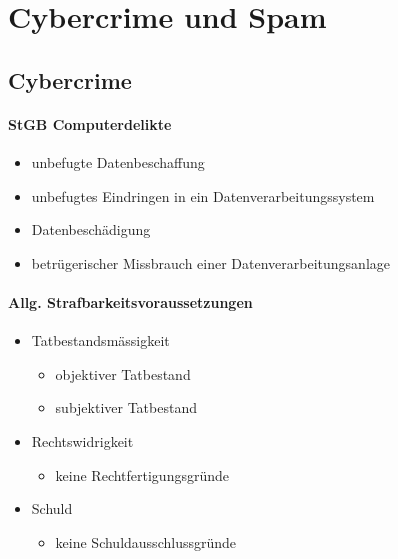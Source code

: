 \section{Cybercrime und Spam}
\subsection{Cybercrime}

\begin{minipage}{0.5\linewidth}
    \paragraph{StGB Computerdelikte}
    \begin{itemize}
        \item unbefugte Datenbeschaffung
        \item unbefugtes Eindringen in ein Datenverarbeitungssystem
        \item Datenbeschädigung
        \item betrügerischer Missbrauch einer Datenverarbeitungsanlage
    \end{itemize}
\end{minipage}
\begin{minipage}{0.5\linewidth}
    \paragraph{Allg. Strafbarkeitsvoraussetzungen}
    \begin{itemize}
        \item Tatbestandsmässigkeit
        \begin{itemize}
            \item objektiver Tatbestand
            \item subjektiver Tatbestand
        \end{itemize}
        \item Rechtswidrigkeit
        \begin{itemize}
            \item keine Rechtfertigungsgründe
        \end{itemize}
        \item Schuld
        \begin{itemize}
            \item keine Schuldausschlussgründe
        \end{itemize}
    \end{itemize}
\end{minipage}

